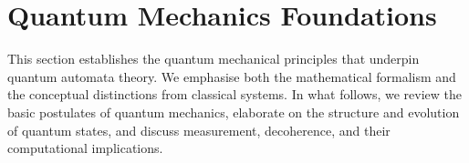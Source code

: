 \section{Quantum Mechanics Foundations}
\label{sec:quantum-foundations}

This section establishes the quantum mechanical principles that underpin quantum automata theory. We emphasise both the mathematical formalism and the conceptual distinctions from classical systems. In what follows, we review the basic postulates of quantum mechanics, elaborate on the structure and evolution of quantum states, and discuss measurement, decoherence, and their computational implications.




 
    